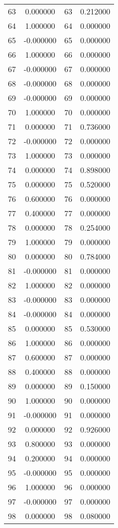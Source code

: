 \documentclass[12pt]{article}
\begin{document}
\begin{longtable}{@{}cccc@{}}
63 & 0.000000 & 63 & 0.212000 \\
64 & 1.000000 & 64 & 0.000000 \\
65 & -0.000000 & 65 & 0.000000 \\
66 & 1.000000 & 66 & 0.000000 \\
67 & -0.000000 & 67 & 0.000000 \\
68 & -0.000000 & 68 & 0.000000 \\
69 & -0.000000 & 69 & 0.000000 \\
70 & 1.000000 & 70 & 0.000000 \\
71 & 0.000000 & 71 & 0.736000 \\
72 & -0.000000 & 72 & 0.000000 \\
73 & 1.000000 & 73 & 0.000000 \\
74 & 0.000000 & 74 & 0.898000 \\
75 & 0.000000 & 75 & 0.520000 \\
76 & 0.600000 & 76 & 0.000000 \\
77 & 0.400000 & 77 & 0.000000 \\
78 & 0.000000 & 78 & 0.254000 \\
79 & 1.000000 & 79 & 0.000000 \\
80 & 0.000000 & 80 & 0.784000 \\
81 & -0.000000 & 81 & 0.000000 \\
82 & 1.000000 & 82 & 0.000000 \\
83 & -0.000000 & 83 & 0.000000 \\
84 & -0.000000 & 84 & 0.000000 \\
85 & 0.000000 & 85 & 0.530000 \\
86 & 1.000000 & 86 & 0.000000 \\
87 & 0.600000 & 87 & 0.000000 \\
88 & 0.400000 & 88 & 0.000000 \\
89 & 0.000000 & 89 & 0.150000 \\
90 & 1.000000 & 90 & 0.000000 \\
91 & -0.000000 & 91 & 0.000000 \\
92 & 0.000000 & 92 & 0.926000 \\
93 & 0.800000 & 93 & 0.000000 \\
94 & 0.200000 & 94 & 0.000000 \\
95 & -0.000000 & 95 & 0.000000 \\
96 & 1.000000 & 96 & 0.000000 \\
97 & -0.000000 & 97 & 0.000000 \\
98 & 0.000000 & 98 & 0.080000 \\

\end{longtable}
\end{document}
